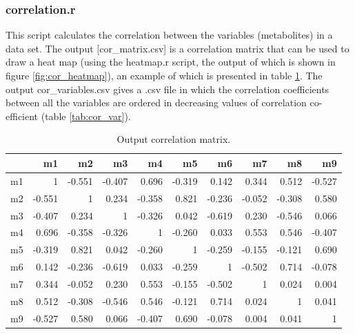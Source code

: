 \documentclass[english,a4paper,12pt]{article}
\begin{document}
\subsubsection*{correlation.r}
This script calculates the correlation between the variables (metabolites) in a data set. The output [\textsf{cor\_matrix.csv}] is a correlation matrix that can be used to draw a heat map (using the \textsf{heatmap.r} script, the output of which is shown in figure \ref{fig:cor_heatmap}), an example of which is presented in table \ref{tab:cor_mat}. The output \textsf{cor\_variables.csv} gives a .csv file in which the correlation coefficients  between all the variables  are ordered in decreasing values of correlation co-efficient (table \ref{tab:cor_var}).

\begin{table}[!h]
    \caption[Correlation matrix]{Output correlation matrix.}
    \begin{center}
        \begin{tabular}{lrrrrrrrrr}
        \toprule
          & m1 & m2 & m3 & m4 & m5 & m6 & m7 & m8 & m9\\
        \midrule
          m1 & 1 & -0.551 & -0.407 & 0.696 & -0.319 & 0.142 & 0.344 & 0.512 & -0.527\\
          m2 & -0.551 & 1 & 0.234 & -0.358 & 0.821 & -0.236 & -0.052 & -0.308 & 0.580\\
          m3 & -0.407 & 0.234 & 1 & -0.326 & 0.042 & -0.619 & 0.230 & -0.546 & 0.066\\
          m4 & 0.696 & -0.358 & -0.326 & 1 & -0.260 & 0.033 & 0.553 & 0.546 & -0.407\\
          m5 & -0.319 & 0.821 & 0.042 & -0.260 & 1 & -0.259 & -0.155 & -0.121 & 0.690\\
          m6 & 0.142 & -0.236 & -0.619 & 0.033 & -0.259 & 1 & -0.502 & 0.714 & -0.078\\
          m7 & 0.344 & -0.052 & 0.230 & 0.553 & -0.155 & -0.502 & 1 & 0.024 & 0.004\\
          m8 & 0.512 & -0.308 & -0.546 & 0.546 & -0.121 & 0.714 & 0.024 & 1 & 0.041\\
          m9 & -0.527 & 0.580 & 0.066 & -0.407 & 0.690 & -0.078 & 0.004 & 0.041 & 1\\
        \bottomrule
        \end{tabular}
    \end{center}
    \label{tab:cor_mat}
\end{table}
\end{document}
